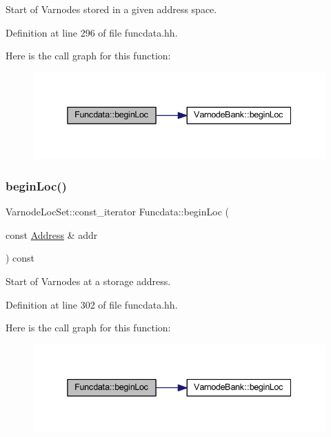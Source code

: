 Start of Varnodes stored in a given address space. 



Definition at line 296 of file funcdata.\+hh.

Here is the call graph for this function\+:
\nopagebreak
\begin{figure}[H]
\begin{center}
\leavevmode
\includegraphics[width=338pt]{class_funcdata_a6d8fa3ac2bdccfd83dd3eba870ef3b09_cgraph}
\end{center}
\end{figure}
\mbox{\label{class_funcdata_a04bcc9eaf90591b9200db7cfd1c2fce5}} 
\subsubsection{\texorpdfstring{beginLoc()}{beginLoc()}\hspace{0.1cm}{\footnotesize\ttfamily [3/6]}}
{\footnotesize\ttfamily Varnode\+Loc\+Set\+::const\+\_\+iterator Funcdata\+::begin\+Loc (\begin{DoxyParamCaption}\item[{const \mbox{\hyperlink{class_address}{Address}} \&}]{addr }\end{DoxyParamCaption}) const\hspace{0.3cm}{\ttfamily [inline]}}



Start of Varnodes at a storage address. 



Definition at line 302 of file funcdata.\+hh.

Here is the call graph for this function\+:
\nopagebreak
\begin{figure}[H]
\begin{center}
\leavevmode
\includegraphics[width=338pt]{class_funcdata_a04bcc9eaf90591b9200db7cfd1c2fce5_cgraph}
\end{center}
\end{figure}
\mbox{\label{class_funcdata_ad2b7ea0975c8f7022f14158d3bb9e9d5}} 
